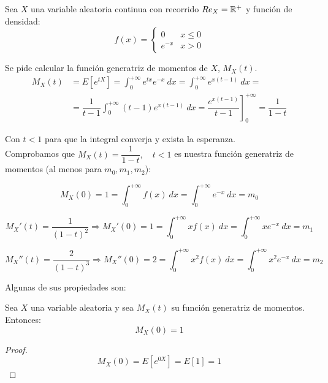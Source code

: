 \begin{ejemplo}
    Sea $X$ una variable aleatoria continua con recorrido $Re_X = \mathbb R^{+}$ y función de densidad:
    $$f(x) = \left\{ \begin{array}{ll}
        0      & x \leq 0 \\
        e^{-x} & x > 0
      \end{array} \right.$$
    
    Se pide calcular la función generatriz de momentos de $X$, $M_X(t)$.
    \begin{equation*}\begin{split}
        M_X(t) &= E[e^{tX}] = \int_0^{+\infty} e^{tx} e^{-x}~dx = \int_0^{+\infty} e^{x(t-1)}~dx =\\
        &=\dfrac{1}{t-1} \int_0^{+\infty} (t-1) e^{x(t-1)}~dx = \left. \dfrac{e^{x(t-1)}}{t-1} \right]_0^{+\infty} = \dfrac{1}{1-t}
    \end{split}\end{equation*}
    
    Con $t<1$ para que la integral converja y exista la esperanza.\\
    
    Comprobamos que $M_X(t) = \dfrac{1}{1-t},\quad t<1$ es nuestra función generatriz de momentos (al menos para $m_0,m_1,m_2$):
    
    $$M_X(0) = 1 = \int_0^{+\infty} f(x)~dx = \int_0^{+\infty} e^{-x}~dx = m_0$$
    
    $$M_X'(t) = \dfrac{1}{(1-t)^2}\Longrightarrow M_X'(0) = 1 = \int_0^{+\infty} xf(x)~dx = \int_0^{+\infty} xe^{-x}~dx = m_1$$
    
    $$M_X''(t) = \dfrac{2}{(1-t)^3} \Longrightarrow M_X''(0) = 2 = \int_0^{+\infty} x^2f(x)~dx = \int_0^{+\infty} x^2e^{-x}~dx = m_2$$
\end{ejemplo}

Algunas de sus propiedades son:
\begin{lema}
    Sea $X$ una variable aleatoria y sea $M_X(t)$ su función generatriz de momentos. Entonces:
    $$M_X(0)=1$$
\end{lema}
\begin{proof}
    $$M_X(0) = E[e^{0X}] = E[1] = 1$$
\end{proof}

